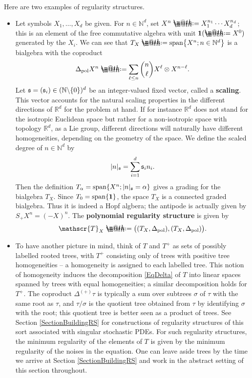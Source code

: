 \documentclass[10pt, reqno]{amsart}
\makeatletter
\numberwithin{subsection}{section}
\numberwithin{subsubsection}{subsection}
\numberwithin{equation}{section} %
\theoremstyle{mystyle}
\theoremstyle{mystyle2}
\theoremstyle{mystyle3}
\newcommand\bbN{\mathbb{N}}
\newcommand\bbR{\mathbb{R}}
\newcommand*{\defeq}{\mathrel{\rlap{%
                     \raisebox{0.3ex}{$\m@th\cdot$}}%
                     \raisebox{-0.3ex}{$\m@th\cdot$}}%
                     =}
\makeatother
\begin{document}
Here are two examples of regularity structures.
\begin{itemize}
\item[--] Let symbols $X_1,\dots, X_d$ be given. For $n\in\bbN^d$, set $X^n \defeq  X_1^{n_1}\cdots X_d^{n_d}$; this is an element of the free commutative algebra with unit ${\bf1}(\defeq X^0)$ generated by the $X_i$. We can see that $T_X\defeq \textrm{span}\big\{X^n;n\in\bbN^d\big\}$ is a bialgebra with the coproduct
\begin{align}\label{eq coproduct on polynomial}
\Delta_\textrm{pol} X^n \defeq  \sum_{\ell\leq n} \binom{n}{\ell} X^\ell\otimes X^{n-\ell}.   
\end{align}
Let $\frak{s}=(\frak{s}_i)\in(\bbN\backslash\{0\})^d$ be an integer-valued fixed vector, called a \textsf{\textbf{scaling}}. This vector accounts for the natural scaling properties in the different directions of $\bbR^d$ for the problem at hand. If for instance $\bbR^d$ does not stand for the isotropic 
Euclidean space but rather for a non-isotropic space with topology $\bbR^d$, as a Lie group, different directions will naturally have different homogeneities, depending on the geometry of the space. We define the scaled 
degree of $n\in\bbN^d$ by
$$
|n|_{\frak{s}}=\sum_{i=1}^d\frak{s}_in_i.
$$
Then the definition $T_\alpha=\textrm{span}\{X^n;\vert n\vert_{\frak{s}}=\alpha\}$ gives a grading for the bialgebra $T_X$. Since $T_0=\textrm{span}\{\bf1\}$, the space $T_X$ is a connected graded bialgebra. Thus it is indeed a Hopf algbera; the antipode is actually given by $S_+X^n=(-X)^n$. The \textsf{\textbf{polynomial regularity structure}} is given by
$$
\mathscr{T}_X\defeq \big((T_X,\Delta_\textrm{pol}),(T_X,\Delta_\textrm{pol})\big).
$$
   
   \item[--] To have another picture in mind, think of $T$ and $T^+$ as sets of possibly labelled rooted trees, with $T^+$ consisting only of trees with positive tree homogeneities -- a homogeneity is assigned to each labelled tree. This notion of homogeneity induces the decomposition \eqref{EqDelta} of $T$ into linear spaces spanned by trees with equal homogeneities; a similar decomposition holds for $T^+$. The coproduct $\Delta^{(+)}\tau$ is typically a sum over subtrees $\sigma$ of $\tau$ with the same root as $\tau$, and $\tau/\sigma$ is the quotient tree obtained from $\tau$ by identifying $\sigma$ with the root; this quotient tree is better seen as a product of trees. See Section \ref{SectionBuildingRS} for constructions of regularity structures of this sort associated with singular stochastic PDEs. For such regularity structures, the minimum regularity of the elements of $T$ is given by the minimum regularity of the noises in the equation. One can leave aside trees by the time we arrive at Section \ref{SectionBuildingRS} and work in the abstract setting of this section throughout.
\end{itemize}
\end{document}
